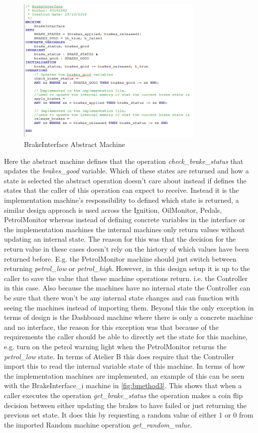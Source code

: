 \documentclass[12pt]{article}
\begin{document}
\begin{figure}[H]
	\centering
	\includegraphics[width=0.8\textwidth]{brake_interface}
	\caption{BrakeInterface Abstract Machine}
	\label{fig:bmethod2}
\end{figure}

Here the abstract machine defines that the operation \textit{check\_brake\_status} that updates the \textit{brakes\_good} variable. Which of these states are returned and how a state is selected the abstract operation doesn’t care about instead if defines the states that the caller of this operation can expect to receive. Instead it is the implementation machine’s responsibility to defined which state is returned, a similar design approach is used across the Ignition, OilMonitor, Pedals, PetrolMonitor whereas instead of defining concrete variables in the interface or the implementation machines the internal machines only return values without updating an internal state. The reason for this was that the decision for the return value in these cases doesn’t rely on the history of which values have been returned before. E.g. the PetrolMonitor machine should just switch between returning \textit{petrol\_low} or \textit{petrol\_high}. However, in this design setup it is up to the caller to save the value that these machine operations return. i.e. the Controller in this case. Also because the machines have no internal state the Controller can be sure that there won’t be any internal state changes and can function with seeing the machines instead of importing them. 
Beyond this the only exception in terms of design is the Dashboard machine where there is only a concrete machine and no interface, the reason for this exception was that because of the requirements the caller should be able to directly set the state for this machine, e.g. turn on the petrol warning light when the PetrolMonitor returns the \textit{petrol\_low} state. In terms of Atelier B this does require that the Controller import this to read the internal variable state of this machine.
In terms of how the implementation machines are implemented, an example of this can be seen with the BrakeInterface\_i machine in \ref{fig:bmethod3}. This shows that when a caller executes the operation \textit{get\_brake\_status} the operation makes a coin flip decision between either updating the brakes to have failed or just returning the previous set state. It does this by requesting a random value of either 1 or 0 from the imported Random machine operation \textit{get\_random\_value}. 
\end{document}
